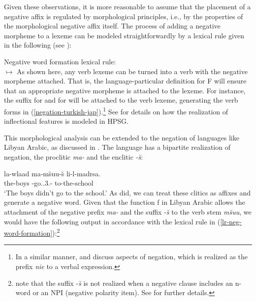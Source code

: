 \documentclass[output=paper
 	        ,biblatex
                ,babelshorthands
                ,newtxmath
                ,draftmode
                ,colorlinks, citecolor=brown
]{langscibook}
\begin{document}
\begin{exe}
\begin{xlist}
\begin{exe}
\begin{xlist}
Given these observations, it is more reasonable to assume that the placement of a
negative affix is regulated by morphological principles, i.e., by
the properties of the morphological negative affix itself.
The process of adding a negative morpheme to a lexeme can be modeled
straightforwardly by a lexical rule given in the following (see \citealt{Kim:00,Crowgey:12}):

\ea
\label{lr-neg-word-formation}
Negative word formation lexical rule:\\
 $\mapsto$
\z
{}
%
%
As shown here, any verb lexeme can be turned into a verb with the negative
morpheme attached. That is, the language-particular definition for
F will ensure that an appropriate
negative morpheme is attached to the lexeme. For instance, the
suffix  for  and  for  will be attached to the verb
lexeme, generating the verb forms in (\ref{negation-turkish-jap}).\footnote{In a similar
manner, \citet{PK:99} and \citet{Prz:00, Prz:01}
discuss aspects of  negation, which is realized as the prefix
  \emph{nie} to a verbal expression.} See  for details on how the
realization of inflectional features is modeled in HPSG.

This morphological analysis can be extended to the negation of languages
like Libyan Arabic, as discussed in \citet{BK:12}. The language
has a bipartite realization of negation, the proclitic \emph{ma-} and the enclitic \emph{-\u{s}}:

\ea
\gll la-wlaad ma-m\u{s}uu-\u{s} li-l-madrsa. \\
     the-boys \NEG-go.\pst.3.\pl-\NEG{} to-the-school\\
\glt `The boys didn't go to the school.'
\z
%
As \citet{BK:12} did, we can treat these clitics as affixes and generate
a negative word. Given that the function
f in Libyan Arabic allows the attachment of the negative prefix
\textit{ma-} and the suffix -\textit{\u{s}} to the verb
stem \emph{m\u{s}uu}, we would have the following output in accordance
with the lexical rule in (\ref{lr-neg-word-formation}):\footnote{%
   \citet{BK:12} note that the suffix -\textit{\u{s}} is not realized when a negative clause
   includes an n-word or an NPI (negative polarity item). See \citet{BK:12} for further details.}
%
%



\end{xlist}
\end{exe}
\end{xlist}
\end{exe}
\end{document}
